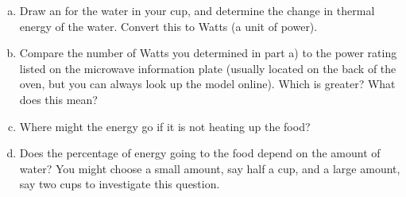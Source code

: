 \begin{enumerate}[(a)]
	\item Draw an \EnergyDiagram{} for the water in your cup, and determine the change in thermal energy of the water. Convert this to Watts (a unit of power).
	
	\item Compare the number of Watts you determined in part a) to the power rating listed on the microwave information plate (usually located on the back of the oven, but you can always look up the model online). Which is greater? What does this mean?
	
	\item Where might the energy go if it is not heating up the food?
	
	\item Does the percentage of energy going to the food depend on the amount of water? You might choose a small amount, say half a cup, and a large amount, say two cups to investigate this question.
\end{enumerate}